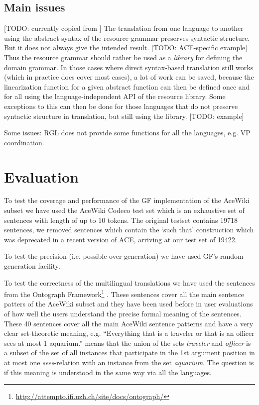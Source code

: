 \documentclass[a4paper]{article}
\begin{document}
\subsection{Main issues}

[TODO: currently copied from \cite{ranta:cnl2009_revised}]
The translation from one language to another using the abstract syntax of the
resource grammar preserves syntactic structure. But it does not always give
the intended result. [TODO: ACE-specific example]
Thus the resource grammar should rather be used as a \emph{library} for
defining the domain grammar. In those cases where direct syntax-based
translation still works (which in practice does cover most cases), a lot of
work can be saved, because the linearization function for a given abstract
function can then be defined once and for all using the language-independent
API of the resource library. Some exceptions to this can then be done for
those languages that do not preserve syntactic structure in translation,
but still using the library. [TODO: example]

Some issues: RGL does not provide some functions for all the languages,
e.g. VP coordination.

\section{Evaluation}
\label{section:Evaluation}

To test the coverage and performance of the GF implementation of the
AceWiki subset we have used
the AceWiki Codeco test set which
is an exhaustive set of sentences with length of up to 10 tokens.
The original testset contains 19718 sentences, we removed sentences which
contain the `such that' construction which was deprecated in a recent
version of ACE, arriving at our test set of 19422.

To test the precision (i.e. possible over-generation) we have used GF's
random generation facility.

To test the correctness of the multilingual translations we have used
the sentences from the
Ontograph
Framework\footnote{\url{http://attempto.ifi.uzh.ch/site/docs/ontograph/}}
\cite{kuhn2009cnlmain}. These sentences cover all the main sentence
patters of the AceWiki subset and they have been used before in user
evaluations of how well the users understand the precise formal meaning
of the sentences.
These 40 sentences cover all the main AceWiki sentence patterns and have
a very clear set-theoretic meaning, e.g.
``Everything that is a traveler or that is an officer sees
at most 1 aquarium.'' means that the union of the sets \emph{traveler} and
\emph{officer} is a subset of the set of all instances that participate in
the 1st argument position in at most one \emph{sees}-relation with an
instance from the set \emph{aquarium}.
The question is if this meaning is understood in the same way via all the
languages.
\end{document}
